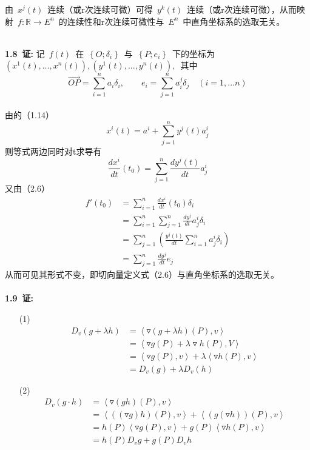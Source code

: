 由\ $x^j(t)$\ 连续（或r次连续可微）可得\ $y^k(t)$\ 连续（或r次连续可微），从而映射\ $f:\mathbb{R}\rightarrow E^n$\ 的连续性和r次连续可微性与\ $E^n$\ 中直角坐标系的选取无关。 
	


\noindent
\\
{\textbf{1.8\ 证:}}	
	记\ $f(t)$\ 在\ $\left\lbrace O;\delta_i \right\rbrace $\ 与\ $\left\lbrace P;e_i \right\rbrace $\ 下的坐标为\ $(x^1(t),...,x^n(t)),(y^1(t),...,y^n(t)),$\ 其中
	\\
	$$\overrightarrow{OP}=\sum_{i=1}^{n}a_i\delta_i,\qquad e_i=\sum_{j=1}^{n}a_i^j\delta_j\quad(i=1,...n)$$
	\\
	由的（1.14）
	$$x^i(t)=a^i+\sum_{j=1}^{n}y^j(t)a^i_j$$
	则等式两边同时对t求导有
	$$\frac{dx^i}{dt}(t_0)=\sum_{j=1}^{n}\frac{dy^j(t)}{dt}a_j^i$$
	又由（2.6）
	\begin{align*}
	f'(t_0)&=\sum_{i=1}^{n}\frac{dx^i}{dt}(t_0)\delta_i
           \\
	       &=\sum_{i=1}^{n}\sum_{j=1}^{n}\frac{dy^j}{dt}a_j^i\delta_i
	       \\
	       &=\sum_{j=1}^{n}\left(\frac{y^j(t)}{dt}\sum_{i=1}^{n}a^i_j\delta_i\right)
	       \\
	       &=\sum_{j=1}^{n}\frac{dy^j}{dt}e_j
	\end{align*}
	从而可见其形式不变，即切向量定义式（2.6）与直角坐标系的选取无关。
\noindent
\\
\\
{\textbf{1.9\ 证:}}
	\begin{itemize}
		\item [(1)]
		\begin{align*}
		D_v(g+\lambda h)&=\left\langle \triangledown (g+\lambda h)(P),v\right\rangle 
		              \\
		                &=\left\langle \triangledown g(P)+\lambda \triangledown h(P),V\right\rangle 
		                \\
		                &=\left\langle \triangledown g(P),v \right\rangle +\lambda \left\langle \triangledown h(P),v \right\rangle
		                \\
		                &=D_v(g)+\lambda D_v(h)
		\end{align*}
		\item [(2)]
		\begin{align*}
		D_v(g\cdot h)&=\left\langle \triangledown (gh)(P),v \right\rangle 
		             \\
		             &=\left\langle ((\triangledown g)h)(P),v \right\rangle +\left\langle (g(\triangledown h))(P),v \right\rangle
		             \\
		             &=h(P)\left\langle \triangledown g(P),v \right\rangle +g(P)\left\langle \triangledown h(P),v \right\rangle
		             \\
		             &=h(P)D_v g+g(P)D_vh
		\end{align*}
	\end{itemize}



